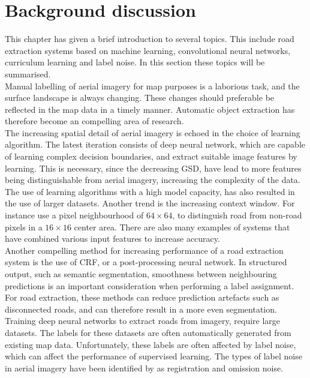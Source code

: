 \section{Background discussion}
\label{sec:backgroundDiscussion}
This chapter has given a brief introduction to several topics. This include road extraction systems based on machine learning, convolutional neural networks, curriculum learning and label noise. In this section these topics will be summarised. \\

Manual labelling of aerial imagery for map purposes is a laborious task, and the surface landscape is always changing. These changes should preferable be reflected in the map data in a timely manner. Automatic object extraction has therefore become an compelling area of research.\\

The increasing spatial detail of aerial imagery is echoed in the choice of learning algorithm. The latest iteration consists of deep neural network, which are capable of learning complex decision boundaries, and extract suitable image features by learning. This is necessary, since the decreasing \ac{GSD}, have lead to more features being distinguishable from aerial imagery, increasing the complexity of the data. The use of learning algorithms with a high model capacity, has also resulted in the use of larger datasets. Another trend is the increasing context window. For instance \cite{Mnih_roads_high_res_aerial_images} use a pixel neighbourhood of $64 \times 64$, to distinguish road from non-road pixels in a $16 \times 16$   center area. There are also many examples of systems that have combined various input features to increase accuracy.\\

Another compelling method for increasing performance of a road extraction system is the use of \ac{CRF}, or a post-processing neural network. In structured output, such as semantic segmentation,  smoothness between neighbouring predictions is an important consideration when performing a label assignment. For road extraction, these methods can reduce prediction artefacts such as disconnected roads, and can therefore result in a more even segmentation.\\

Training deep neural networks to extract roads from imagery, require large datasets. The labels for these datasets are often automatically generated from existing map data. Unfortunately, these labels are often affected by label noise, which can affect the performance of supervised learning. The types of label noise in aerial imagery have been identified by \cite{Mnih_aerial_images_noisy} as registration and omission noise.  \\

